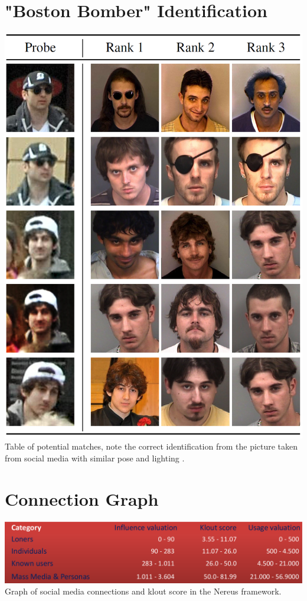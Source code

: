\documentclass{article}
\begin{document}
\begin{appendices}
\section{"Boston Bomber" Identification}
\label{appendix:bostonbomber}
\includegraphics[scale=0.8]{res/boston_bomber.png}
Table of potential matches, note the correct identification from the picture taken from social media with similar pose and lighting \citep{bostonbombingcasestudy}.

\section{Connection Graph}
\label{appendix:connectiongraph}
\includegraphics[width=\linewidth]{res/connection_klout.png}
Graph of social media connections and klout score in the Nereus framework\citep{behaviourdetection}.


\end{appendices}
\end{document}

